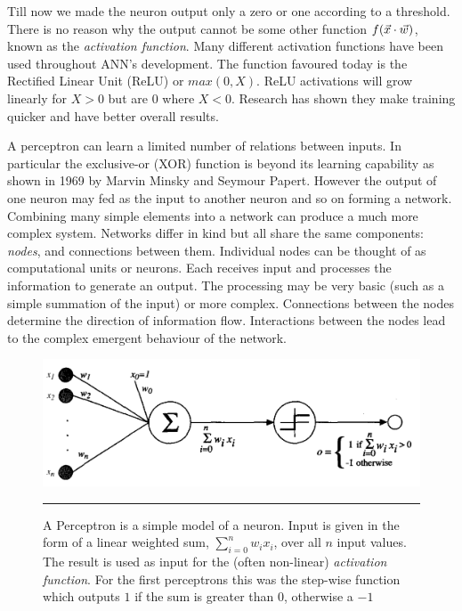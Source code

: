 Till now we made the neuron output only a zero or one according to a threshold.
There is no reason why the output cannot be some other function $f(\vo{x} \cdot \vo{w})$, known as the \textit{activation function}.
Many different activation functions have been used throughout ANN's development.
The function favoured today is the Rectified Linear Unit (ReLU) or $max(0, X)$.
ReLU activations will grow linearly for $X > 0$ but are $0$ where $X < 0$.
Research has shown they make training quicker and have better overall results\citep{NIPS2012_4824}.

A perceptron can learn a limited number of relations between inputs\citep{mo2012survey}.
In particular the exclusive-or (XOR) function is beyond its learning capability as shown in 1969 by Marvin Minsky and Seymour Papert\citep{minsky1969perceptrons}.
However the output of one neuron may fed as the input to another neuron and so on forming a network.
Combining many simple elements into a network can produce a much more complex system\citep{bar1997dynamics}.
Networks differ in kind but all share the same components: \textit{nodes}, and connections between them\citep{gershenson2003artificial}.
Individual nodes can be thought of as computational units or neurons.
Each receives input and processes the information to generate an output.
The processing may be very basic (such as a simple summation of the input) or more complex.
Connections between the nodes determine the direction of information flow.
Interactions between the nodes lead to the complex emergent behaviour of the network.
\begin{figure}[htbp]
	\centering
		\includegraphics[width = 1.0\textwidth]{./Figures/ML_tom_mitchel_perceptron.PNG}
		\rule{35em}{0.5pt}
	\caption[The Perceptron]{A Perceptron is a simple model of a neuron. Input is given in the form of a linear weighted sum, $\sum^n_{i = 0} w_i x_i$, over all $n$ input values. The result is used as input for the (often non-linear) \textit{activation function}. For the first perceptrons this was the step-wise function which outputs $1$ if the sum is greater than $0$, otherwise a $-1$}
	\label{fig:Perceptron}
\end{figure}

